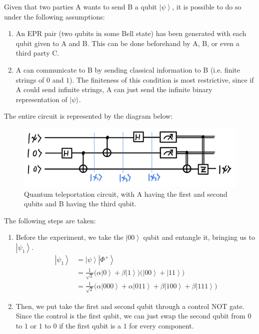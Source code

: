 \documentclass{article}
\newcommand{\ket}[1]{\ensuremath{\left|#1\right\rangle}}
\begin{document}
    \begin{theorem}
      Given that two parties A wants to send B a qubit $\ket{\psi}$, it is possible to do so under the following assumptions: 
      \begin{enumerate}
        \item An EPR pair (two qubits in some Bell state) has been generated with each qubit given to A and B. This can be done beforehand by A, B, or even a third party C. 
        \item A can communicate to B by sending classical information to B (i.e. finite strings of $0$ and $1$). The finiteness of this condition is most restrictive, since if A could send infinite strings, A can just send the infinite binary representation of $|\psi\rangle$.
      \end{enumerate}
      The entire circuit is represented by the diagram below: 
      \begin{figure}[H]
        \centering 
        \includegraphics[scale=0.4]{img/quantum_teleportation.png}
        \caption{Quantum teleportation circuit, with A having the first and second qubits and B having the third qubit. } 
        \label{fig:quantum_teleportation}
      \end{figure}
      The following steps are taken: 
      \begin{enumerate} 
        \item Before the experiment, we take the $\ket{00}$ qubit and entangle it, bringing us to $\ket{\psi_1}$. 
          \begin{align} 
            \ket{\psi_1} & = \ket{\psi} \ket{\Phi^+} \\
                         & = \frac{1}{\sqrt{2}} \big( \alpha \ket{0} + \beta \ket{1} \big) \big( \ket{00} + \ket{11} \big) \\
                         & = \frac{1}{\sqrt{2}} \big( \alpha \ket{000} + \alpha \ket{011} + \beta \ket{100} + \beta \ket{111} \big)
          \end{align}
        \item Then, we put take the first and second qubit through a control NOT gate. Since the control is the first qubit, we can just swap the second qubit from $0$ to $1$ or $1$ to $0$ if the first qubit is a $1$ for every component. 

\end{enumerate}
\end{theorem}
\end{document}
